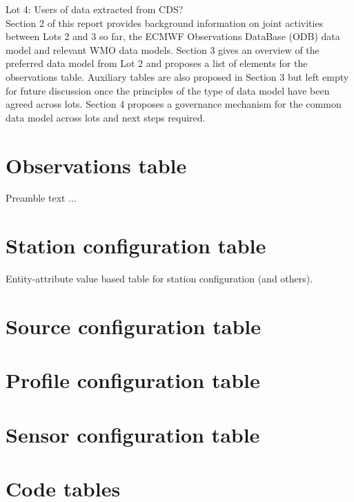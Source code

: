 \documentclass[a4paper]{article}
\begin{document}
Lot 4: Users of data extracted from CDS?\\

Section 2 of this report provides background information on joint activities between Lots 2 and 3 so far, the ECMWF Observations DataBase (ODB) data model and relevant WMO data models. Section 3 gives an overview of the preferred data model from Lot 2 and proposes a list of elements for the observations table. Auxiliary tables are also proposed in Section 3 but left empty for future discussion once the principles of the type of data model have been agreed across lots. Section 4 proposes a governance mechanism for the common data model across lots and next steps required.\\

\section {Observations table}

Preamble text ... \\



\section {Station configuration table}

Entity-attribute value based table for station configuration (and others).

\section {Source configuration table}
\section {Profile configuration table}
\section {Sensor configuration table}
\section {Code tables}
\end{document}

